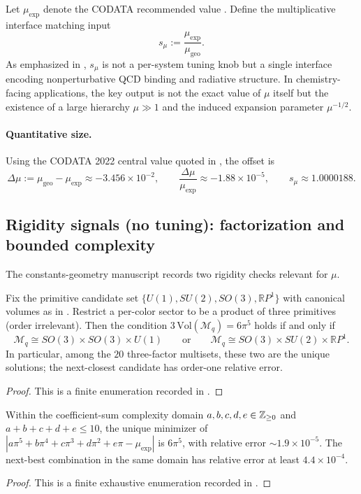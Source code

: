 Let $\mu_{\mathrm{exp}}$ denote the CODATA recommended value \cite{CODATA2022RMP}. Define the multiplicative interface matching input
\begin{equation}
s_\mu:=\frac{\mu_{\mathrm{exp}}}{\mu_{\mathrm{geo}}}.
\end{equation}
As emphasized in \cite{Ma2025PCG}, $s_\mu$ is not a per-system tuning knob but a single interface encoding nonperturbative QCD binding and radiative structure. In chemistry-facing applications, the key output is not the exact value of $\mu$ itself but the existence of a large hierarchy $\mu\gg 1$ and the induced expansion parameter $\mu^{-1/2}$.

\paragraph{Quantitative size.}
Using the CODATA 2022 central value quoted in \cite{Ma2025PCG,CODATA2022RMP}, the offset is
\[
\Delta\mu:=\mu_{\mathrm{geo}}-\mu_{\mathrm{exp}}\approx -3.456\times 10^{-2},
\qquad
\frac{\Delta\mu}{\mu_{\mathrm{exp}}}\approx -1.88\times 10^{-5},
\qquad
s_\mu\approx 1.0000188.
\]

\subsection{Rigidity signals (no tuning): factorization and bounded complexity}
The constants-geometry manuscript records two rigidity checks relevant for $\mu$.

\begin{proposition}\label{prop:mu_factor_rigidity_chem}
Fix the primitive candidate set $\{U(1),SU(2),SO(3),\mathbb{R}P^1\}$ with canonical volumes as in \cite{Ma2025PCG}. Restrict a per-color sector to be a product of three primitives (order irrelevant). Then the condition $3\,\mathrm{Vol}(\mathcal{M}_q)=6\pi^5$ holds if and only if
\[
\mathcal{M}_q\cong SO(3)\times SO(3)\times U(1)
\qquad\text{or}\qquad
\mathcal{M}_q\cong SO(3)\times SU(2)\times \mathbb{R}P^1.
\]
In particular, among the $20$ three-factor multisets, these two are the unique solutions; the next-closest candidate has order-one relative error.
\end{proposition}
\begin{proof}
This is a finite enumeration recorded in \cite{Ma2025PCG}.
\end{proof}

\begin{proposition}\label{prop:mu_integer_rigidity_chem}
Within the coefficient-sum complexity domain $a,b,c,d,e\in\mathbb{Z}_{\ge 0}$ and $a+b+c+d+e\le 10$, the unique minimizer of
$|a\pi^5+b\pi^4+c\pi^3+d\pi^2+e\pi-\mu_{\mathrm{exp}}|$
is $6\pi^5$, with relative error $\sim 1.9\times 10^{-5}$. The next-best combination in the same domain has relative error at least $4.4\times 10^{-4}$.
\end{proposition}
\begin{proof}
This is a finite exhaustive enumeration recorded in \cite{Ma2025PCG}.
\end{proof}



